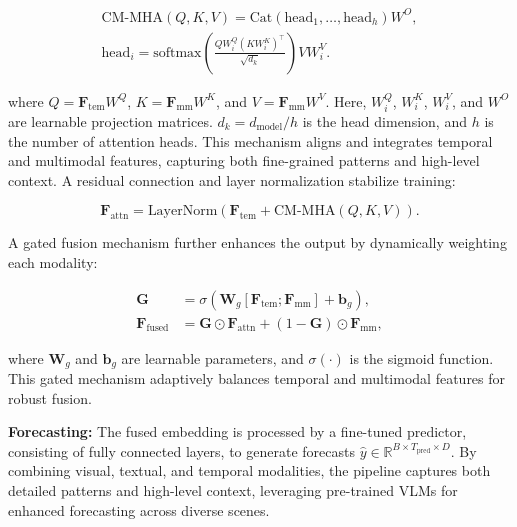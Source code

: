 \vspace{-2em}
\begin{align}
    \text{CM-MHA}(Q, K, V) = \text{Cat}(\text{head}_1, \dots, \text{head}_h)W^O, \\
    \text{head}_i = \text{softmax}\left(\frac{QW_i^Q (KW_i^K)^\top}{\sqrt{d_k}}\right) VW_i^V.
\end{align}
\vspace{-1em}

where \( Q = \mathbf{F}_{\text{tem}} W^Q \), \( K = \mathbf{F}_{\text{mm}} W^K \), and \( V = \mathbf{F}_{\text{mm}} W^V \). Here, \( W_i^Q \), \( W_i^K \), \( W_i^V \), and \( W^O \) are learnable projection matrices. \( d_k = d_{\text{model}} / h \) is the head dimension, and \( h \) is the number of attention heads. This mechanism aligns and integrates temporal and multimodal features, capturing both fine-grained patterns and high-level context. A residual connection and layer normalization stabilize training:

\vspace{-1.5em}
\begin{equation}
    \mathbf{F}_{\text{attn}} = \text{LayerNorm}(\mathbf{F}_{\text{tem}} + \text{CM-MHA}(Q, K, V)).
\end{equation}
\vspace{-1.5em}

A gated fusion mechanism further enhances the output by dynamically weighting each modality:

\vspace{-1.5em}
\begin{align}
    \mathbf{G} &= \sigma(\mathbf{W}_g [\mathbf{F}_{\text{tem}}; \mathbf{F}_{\text{mm}}] + \mathbf{b}_g), \\
    \mathbf{F}_{\text{fused}} &= \mathbf{G} \odot \mathbf{F}_{\text{attn}} + (1 - \mathbf{G}) \odot \mathbf{F}_{\text{mm}},
\end{align}
\vspace{-1.5em}

where \( \mathbf{W}_g \) and \( \mathbf{b}_g \) are learnable parameters, and \( \sigma(\cdot) \) is the sigmoid function. This gated mechanism adaptively balances temporal and multimodal features for robust fusion.


\noindent\textbf{Forecasting:} The fused embedding is processed by a fine-tuned predictor, consisting of fully connected layers, to generate forecasts \( \hat{y} \in \mathbb{R}^{B \times T_{\text{pred}} \times D} \). By combining visual, textual, and temporal modalities, the pipeline captures both detailed patterns and high-level context, leveraging pre-trained VLMs for enhanced forecasting across diverse scenes.

